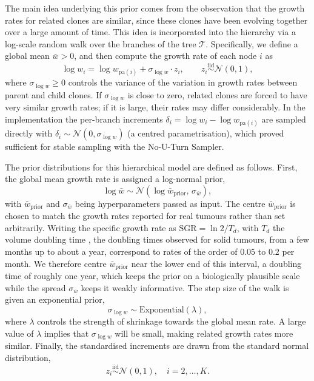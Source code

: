 The main idea underlying this prior comes from the observation that the growth 
rates for related clones are similar, since these clones have been evolving together 
over a large amount of time. This idea is incorporated into the hierarchy via a 
log-scale random walk over the branches of the tree $\mathcal{T}$. Specifically, 
we define a global mean $\bar{w} > 0$, and then compute the growth rate of each 
node $i$ as
%
\begin{equation}
    \log w_i = \log w_{\mathrm{pa}(i)} + \sigma_{\log w} \cdot z_i, 
    \qquad z_i \overset{\mathrm{iid}}{\sim} \mathcal{N}(0, 1),
\end{equation}
%
where $\sigma_{\log w} \geq 0$ controls the variance of the variation in growth 
rates between parent and child clones. If $\sigma_{\log w}$ is close to zero, 
related clones are forced to have very similar growth rates; if it is large, their 
rates may differ considerably. In the implementation the per-branch increments $\delta_i = \log w_i - \log w_{\mathrm{pa}(i)}$ are sampled directly with $\delta_i \sim \mathcal{N}(0, \sigma_{\log w})$ (a centred parametrisation), which proved sufficient for stable sampling with the No-U-Turn Sampler.

The prior distributions for this hierarchical model are defined as follows. First, 
the global mean growth rate is assigned a log-normal prior,
%
\begin{equation}
    \log \bar{w} \sim \mathcal{N}\!\left(\log \bar{w}_{\mathrm{prior}},\, 
    \sigma_{\bar{w}}\right),
\end{equation}
%
with $\bar{w}_{\mathrm{prior}}$ and $\sigma_{\bar{w}}$ being hyperparameters
passed as input. The centre $\bar{w}_{\mathrm{prior}}$ is chosen to match the growth
rates reported for real tumours rather than set arbitrarily. Writing the specific
growth rate as $\mathrm{SGR} = \ln 2 / T_d$, with $T_d$ the volume doubling time
\parencite{mehrara2007specific}, the doubling times observed for solid tumours, from a
few months up to about a year, correspond to rates of the order of $0.05$ to $0.2$ per
month. We therefore centre $\bar{w}_{\mathrm{prior}}$ near the lower end of this
interval, a doubling time of roughly one year, which keeps the prior on a biologically
plausible scale while the spread $\sigma_{\bar{w}}$ keeps it weakly informative. The
step size of the walk is given an exponential prior,
%
\begin{equation}
    \sigma_{\log w} \sim \mathrm{Exponential}(\lambda),
\end{equation}
%
where $\lambda$ controls the strength of shrinkage towards the global mean rate. 
A large value of $\lambda$ implies that $\sigma_{\log w}$ will be small, making 
related growth rates more similar. Finally, the standardised increments are drawn 
from the standard normal distribution,
%
\begin{equation}
    z_i \overset{\mathrm{iid}}{\sim} \mathcal{N}(0, 1), \quad i = 2, \ldots, K.
\end{equation}

